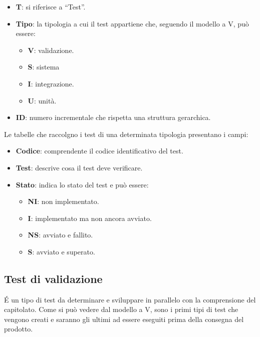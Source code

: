 \begin{itemize}
	\item \textbf{T}: si riferisce a ``Test''.
	\item \textbf{Tipo}: la tipologia a cui il test appartiene che, seguendo il modello a V, può essere:
	\begin{itemize}
		\item \textbf{V}: validazione. %
		\item \textbf{S}: sistema
		\item \textbf{I}: integrazione.
		\item \textbf{U}: unità.
		\end{itemize}
	\item \textbf{ID}: numero incrementale che rispetta una struttura gerarchica.
\end{itemize}

\newcommand{\TNI}{{\color{gray}\textbf{NI}}}
\newcommand{\TI}{{\color{blue}\textbf{I}}}
\newcommand{\TNS}{{\color{red}\textbf{NS}}}
\newcommand{\TS}{{\color{green}\textbf{S}}}

Le tabelle che raccolgno i test di una determinata tipologia presentano i campi:
\begin{itemize}
	\item \textbf{Codice}: comprendente il codice identificativo del test.
	\item \textbf{Test}: descrive cosa il test deve verificare.
	\item \textbf{Stato}: indica lo stato del test e può essere:
	\begin{itemize}
		\item \TNI: non implementato.
		\item \TI: implementato ma non ancora avviato.
		\item \TNS: avviato e fallito.
		\item \TS: avviato e superato.
	\end{itemize}	
\end{itemize}

\subsection{Test di validazione} \label{testvalidazione} %
\'E un tipo di test da determinare e sviluppare in parallelo con la comprensione del capitolato.
Come si può vedere dal modello a V, sono i primi tipi di test che vengono creati e saranno gli ultimi ad essere eseguiti prima della consegna del prodotto.

